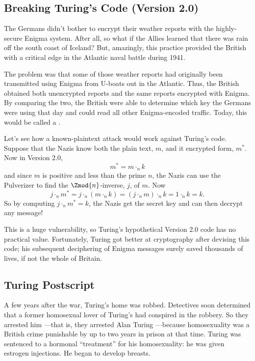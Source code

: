 \subsection{Breaking Turing's Code (Version 2.0)}

The Germans didn't bother to encrypt their weather reports with the
highly-secure Enigma system.  After all, so what if the Allies learned
that there was rain off the south coast of Iceland?  But, amazingly,
this practice provided the British with a critical edge in the
Atlantic naval battle during 1941.

The problem was that some of those weather reports had originally been
transmitted using Enigma from U-boats out in the Atlantic.  Thus, the
British obtained both unencrypted reports and the same reports
encrypted with Enigma.  By comparing the two, the British were able to
determine which key the Germans were using that day and could read all
other Enigma-encoded traffic.  Today, this would be called a
.

Let's see how a known-plaintext attack would work against Turing's
code.  Suppose that the Nazis know both the plain text, $m$, and it
encrypted form, $m^*$.  Now in Version 2.0,
\[
m^* = m \cdot_n k
\]
and since $m$ is positive and less than the prime $n$, the Nazis can
use the Pulverizer to find the $\Zmod{n}$-inverse, $j$, of $m$.  Now
\[
j \cdot_n m^* = j \cdot_n (m \cdot_n k) = (j \cdot_n m) \cdot_n k
= 1 \cdot_n k = k.
\]
So by computing $j \cdot_n m^* = k$, the Nazis get the secret key and
can then decrypt any message!

This is a huge vulnerability, so Turing's hypothetical Version 2.0
code has no practical value.  Fortunately, Turing got better at
cryptography after devising this code; his subsequent deciphering of
Enigma messages surely saved thousands of lives, if not the whole of
Britain.


\subsection{Turing Postscript}

A few years after the war, Turing's home was robbed.  Detectives soon
determined that a former homosexual lover of Turing's had conspired in
the robbery.  So they arrested him ---that is, they arrested Alan
Turing ---because homosexuality was a British crime punishable by up
to two years in prison at that time.  Turing was sentenced to a
hormonal ``treatment'' for his homosexuality: he was given estrogen
injections.  He began to develop breasts.

